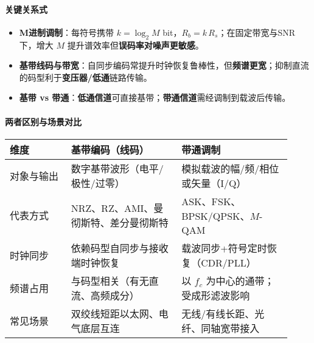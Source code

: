 \documentclass[lang=cn,newtx,10pt,scheme=chinese]{../../elegantbook}
\begin{document}
\begin{center}
{}%
\end{center}

\paragraph{关键关系式}
\begin{itemize}
    \item \textbf{M进制调制}：每符号携带 $k=\log_2 M$ bit，$R_b = k\,R_s$；在固定带宽与SNR下，增大 $M$ 提升谱效率但\textbf{误码率对噪声更敏感}。
    \item \textbf{基带线码与带宽}：自同步编码常提升时钟恢复鲁棒性，但\textbf{频谱更宽}；抑制直流的码型利于\textbf{变压器/低通}链路传输。
    \item \textbf{基带 vs 带通}：\textbf{低通信道}可直接基带；\textbf{带通信道}需经调制到载波后传输。
\end{itemize}

\paragraph{两者区别与场景对比}
{\small\begin{longtable}{|p{0.20\linewidth}|p{0.36\linewidth}|p{0.36\linewidth}|}
\hline
    	\textbf{维度} & \textbf{基带编码（线码）} & \textbf{带通调制} \\
\hline
对象与输出 & 数字基带波形（电平/极性/过零） & 模拟载波的幅/频/相位或矢量（I/Q） \\
\hline
代表方式 & NRZ、RZ、AMI、曼彻斯特、差分曼彻斯特 & ASK、FSK、BPSK/QPSK、$M$-QAM \\
\hline
时钟同步 & 依赖码型自同步与接收端时钟恢复 & 载波同步+符号定时恢复（CDR/PLL） \\
\hline
频谱占用 & 与码型相关（有无直流、高频成分） & 以 $f_c$ 为中心的通带；受成形滤波影响 \\
\hline
常见场景 & 双绞线短距以太网、电气底层互连 & 无线/有线长距、光纤、同轴宽带接入 \\
\hline
\end{longtable}}
\end{document}
